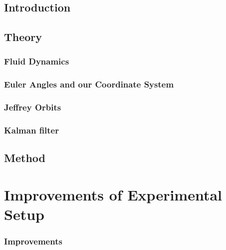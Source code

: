 \documentclass[]{report}
\begin{document}




\setcounter{page}{1}
\pagestyle{fancy}
\setspecialhdr
\tableofcontents


\newpage
\setdefaulthdr
{}	
\setcounter{page}{1}

\chapter{Introduction}



\chapter{Theory}


\section{Fluid Dynamics}


\section{Euler Angles and our Coordinate System}


\section{Jeffrey Orbits}

\section{Kalman filter}

\chapter{Method}

\part{Improvements of Experimental Setup}

\section{Improvements}
\end{document}
